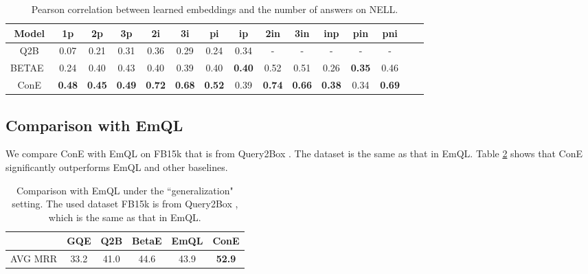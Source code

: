 \documentclass{article}
\newcommand{\betae}{{\normalsize{B}\footnotesize{ETA}\normalsize{E}}}
\begin{document}
\begin{table}[!ht]
    \centering
    \caption{Pearson correlation between learned embeddings and the number of answers on NELL. }
    \label{table:pearson_nell}
    \vspace{1mm}
    \begin{tabular}{c c c  c c c c  c c c c c c c c}
        \toprule
         \textbf{Model} &\textbf{1p} &\textbf{2p} &\textbf{3p} &\textbf{2i} &\textbf{3i} &\textbf{pi} &\textbf{ip} &\textbf{2in} &\textbf{3in} &\textbf{inp} &\textbf{pin} &\textbf{pni} \\
        \midrule
        Q2B &0.07 &0.21 &0.31 &0.36 &0.29 &0.24 &0.34 &- &- &- &- &- \\
        \betae~ &0.24 &0.40 &0.43 &0.40 &0.39 &0.40 &\textbf{0.40} &0.52 &0.51 &0.26 & \textbf{0.35} &0.46  \\
        ConE &\textbf{0.48} & \textbf{0.45} &\textbf{0.49} &\textbf{0.72} &\textbf{0.68} &\textbf{0.52} &0.39 &\textbf{0.74} &\textbf{0.66} &\textbf{0.38} & 0.34 &\textbf{0.69} \\
        \bottomrule
    \end{tabular}
    \vspace{1mm}
\end{table}

\subsection{Comparison with EmQL}
We compare ConE with EmQL \cite{faith} on FB15k that is from Query2Box \cite{q2b}. The dataset is the same as that in EmQL.
Table \ref{table:cmp_results} shows that ConE significantly outperforms EmQL and other baselines. 

\begin{table}[!h]
    \centering
    \caption{Comparison with EmQL \cite{faith} under the ``generalization" setting. The used dataset FB15k is from Query2Box \cite{q2b}, which is the same as that in EmQL. }
    \vspace{1mm}
    \label{table:cmp_results}
        \begin{tabular}{l c c c  c c }
            \toprule
          &GQE & Q2B & BetaE & EmQL & ConE \\
            \midrule
           AVG MRR & 33.2 & 41.0 & 44.6 & 43.9 & \textbf{52.9}\\
            \bottomrule
        \end{tabular}
\end{table}
\end{document}
